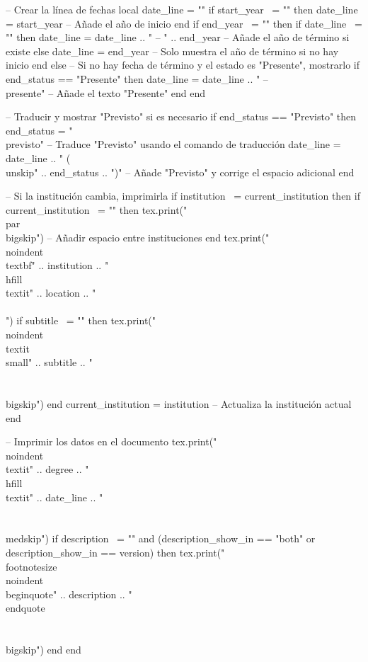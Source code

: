 \begin{luacode}
    -- Crear la línea de fechas
    local date_line = ""
    if start_year ~= "" then
        date_line = start_year -- Añade el año de inicio
    end
    if end_year ~= "" then
        if date_line ~= "" then
            date_line = date_line .. " -- " .. end_year -- Añade el año de término si existe
        else
            date_line = end_year -- Solo muestra el año de término si no hay inicio
        end
    else
        -- Si no hay fecha de término y el estado es "Presente", mostrarlo
        if end_status == "Presente" then
            date_line = date_line .. " -- \\presente" -- Añade el texto "Presente"
        end
    end

    -- Traducir y mostrar "Previsto" si es necesario
    if end_status == "Previsto" then
        end_status = "\\previsto" -- Traduce "Previsto" usando el comando de traducción
        date_line = date_line .. " (\\unskip" .. end_status .. ")" -- Añade "Previsto" y corrige el espacio adicional
    end
    
    -- Si la institución cambia, imprimirla
    if institution ~= current_institution then
        if current_institution ~= "" then
            tex.print("\\par\\bigskip") -- Añadir espacio entre instituciones
        end
        tex.print("\\noindent\\textbf{" .. institution .. "} \\hfill \\textit{" .. location .. "} \\\\ ")
        if subtitle ~= "" then
            tex.print("\\noindent\\textit{\\small{" .. subtitle .. "}} \\\\ \\bigskip")
        end
        current_institution = institution -- Actualiza la institución actual
    end

    -- Imprimir los datos en el documento
    tex.print("\\noindent\\textit{" .. degree .. "} \\hfill \\textit{" .. date_line .. "} \\\\ \\medskip")
    if description ~= "" and (description_show_in == "both" or description_show_in == version) then
        tex.print("{\\footnotesize \\noindent\\begin{quote}" .. description .. "\\end{quote}}\\\\ \\bigskip")
    end
end
\end{luacode}
